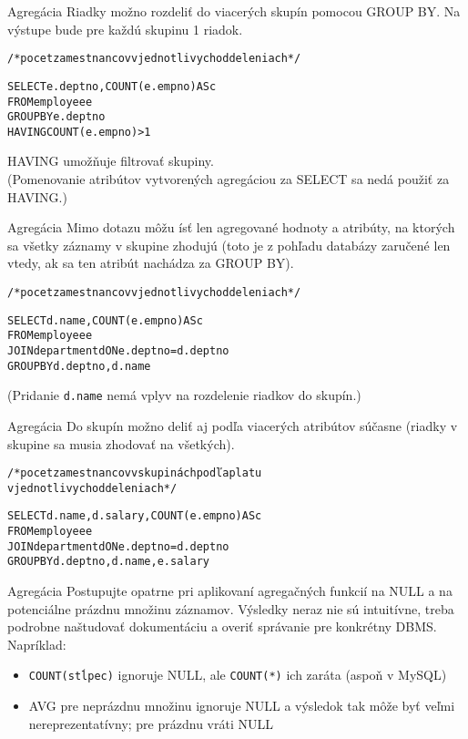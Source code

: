 \documentclass[12pt]{beamer}
\def\blue#1{\textcolor{Cerulean}{#1}}
\begin{document}
\begin{frame}[fragile]{Agregácia}
Riadky možno rozdeliť do viacerých skupín pomocou GROUP BY. Na výstupe bude pre každú skupinu 1 riadok.
\begin{alltt}
/* pocet zamestnancov v jednotlivych oddeleniach */

SELECT e.deptno, \alert{COUNT}(e.empno) AS c
FROM employee e
\alert{GROUP BY} e.deptno
\blue{HAVING} COUNT(e.empno) > 1
\end{alltt}
\bigskip
HAVING umožňuje filtrovať skupiny.\\
(Pomenovanie atribútov vytvorených agregáciou za SELECT sa nedá použiť za HAVING.)
\end{frame}

\begin{frame}[fragile]{Agregácia}
Mimo dotazu môžu ísť len agregované hodnoty a atribúty, na ktorých sa všetky záznamy v skupine zhodujú
(toto je z pohľadu databázy zaručené len vtedy, ak sa ten atribút nachádza za GROUP BY).
\begin{alltt}
/* pocet zamestnancov v jednotlivych oddeleniach */

SELECT \blue{d.name}, \alert{COUNT}(e.empno) AS c
FROM employee e
    JOIN department d ON e.deptno = d.deptno
\alert{GROUP BY} d.deptno, \blue{d.name}
\end{alltt}
(Pridanie \verb|d.name| nemá vplyv na rozdelenie riadkov do skupín.)
\end{frame}

\begin{frame}[fragile]{Agregácia}
Do skupín možno deliť aj podľa viacerých atribútov súčasne (riadky v skupine sa musia zhodovať na všetkých).
\begin{alltt}
/* pocet zamestnancov v skupinách podľa platu
v jednotlivych oddeleniach */

SELECT d.name, d.salary, \alert{COUNT}(e.empno) AS c
FROM employee e
    JOIN department d ON e.deptno = d.deptno
\alert{GROUP BY} d.deptno, d.name, e.salary
\end{alltt}
\end{frame}

\begin{frame}[fragile]{Agregácia}
Postupujte opatrne pri aplikovaní agregačných funkcií na NULL a na potenciálne prázdnu množinu záznamov.
Výsledky neraz nie sú intuitívne, treba podrobne naštudovať dokumentáciu a overiť správanie pre konkrétny DBMS.
Napríklad:
\begin{itemize}
\item \verb|COUNT(stĺpec)| ignoruje NULL, ale \verb|COUNT(*)| ich zaráta (aspoň v MySQL)
\item AVG pre neprázdnu množinu ignoruje NULL a výsledok tak môže byť veľmi nereprezentatívny; pre prázdnu vráti NULL
\end{itemize}
\end{frame}
\end{document}
